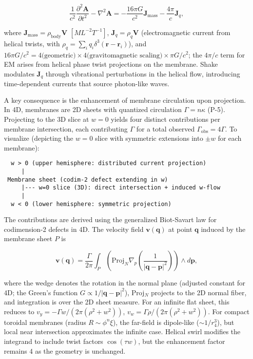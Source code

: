\begin{equation}
\frac{1}{c^2} \frac{\partial^2 \mathbf{A}}{\partial t^2} - \nabla^2 \mathbf{A} = -\frac{16\pi G}{c^2} \mathbf{J}_{\text{mass}} - \frac{4\pi}{c} \mathbf{J}_q,
\end{equation}

where $\mathbf{J}_{\text{mass}} = \rho_{\text{body}} \mathbf{V}$ $[M L^{-2} T^{-1}]$, $\mathbf{J}_q = \rho_q \mathbf{V}$ (electromagnetic current from helical twists, with $\rho_q = \sum_i q_i \delta^3(\mathbf{r} - \mathbf{r}_i)$), and $16\pi G/c^2 = 4 \text{(geometric)} \times 4 \text{(gravitomagnetic scaling)} \times \pi G/c^2$; the $4\pi/c$ term for EM arises from helical phase twist projections on the membrane. Shake modulates $\mathbf{J}_q$ through vibrational perturbations in the helical flow, introducing time-dependent currents that source photon-like waves.

A key consequence is the enhancement of membrane circulation upon projection. In 4D, membranes are 2D sheets with quantized circulation $\Gamma = n \kappa$ (P-5). Projecting to the 3D slice at $w=0$ yields four distinct contributions per membrane intersection, each contributing $\Gamma$ for a total observed $\Gamma_{\text{obs}} = 4\Gamma$. To visualize (depicting the $w=0$ slice with symmetric extensions into $\pm w$ for each membrane):

\begin{verbatim}
  w > 0 (upper hemisphere: distributed current projection)
     |
 Membrane sheet (codim-2 defect extending in w)
     |--- w=0 slice (3D): direct intersection + induced w-flow
     |
  w < 0 (lower hemisphere: symmetric projection)
\end{verbatim}

The contributions are derived using the generalized Biot-Savart law for codimension-2 defects in 4D. The velocity field $\mathbf{v}(\mathbf{q})$ at point $\mathbf{q}$ induced by the membrane sheet $P$ is

\[
\mathbf{v}(\mathbf{q}) = \frac{\Gamma}{2\pi} \int_P \left( \text{Proj}_N \nabla_p \left( \frac{1}{|\mathbf{q} - \mathbf{p}|^2} \right) \right) \wedge d\mathbf{p},
\]

where the wedge denotes the rotation in the normal plane (adjusted constant for 4D; the Green's function $G \propto 1/|\mathbf{q}-\mathbf{p}|^2$), Proj$_N$ projects to the 2D normal fiber, and integration is over the 2D sheet measure. For an infinite flat sheet, this reduces to $v_y = -\Gamma w / (2\pi (\rho^2 + w^2))$, $v_w = \Gamma \rho / (2\pi (\rho^2 + w^2))$. For compact toroidal membranes (radius $R \sim \phi^n \xi$), the far-field is dipole-like ($\sim 1/r_4^3$), but local near intersection approximates the infinite case. Helical swirl modifies the integrand to include twist factors $\cos(\tau w)$, but the enhancement factor remains 4 as the geometry is unchanged.

